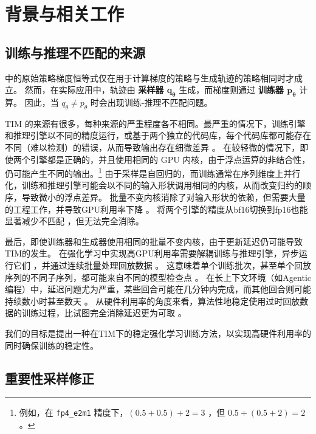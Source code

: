 \section{背景与相关工作}
\label{sec:background}

\subsection{训练与推理不匹配的来源}

 中的原始策略梯度恒等式仅在用于计算梯度的策略与生成轨迹的策略相同时才成立。  
然而，在实际应用中，轨迹由 \textbf{采样器 $\bm{q_\theta}$ } 生成，而梯度则通过 \textbf{训练器 $\bm{p_\theta}$ } 计算。  
因此，当 $q_\theta \ne p_\theta$ 时会出现训练-推理不匹配问题。

TIM 的来源有很多，每种来源的严重程度各不相同。最严重的情况下，训练引擎和推理引擎以不同的精度运行，或基于两个独立的代码库，每个代码库都可能存在不同（难以检测）的错误，从而导致输出存在细微差异 \citep{speed_kills_stability, flashinfer_sentinel}。  
在较轻微的情况下，即使两个引擎都是正确的，并且使用相同的 GPU 内核，由于浮点运算的非结合性，仍可能产生不同的输出。\footnote{例如，在 \texttt{fp4\_e2m1} 精度下，$(0.5+0.5)+2=3$ ，但 $0.5+(0.5+2)=2$ 。}
由于采样是自回归的，而训练通常在序列维度上并行化，训练和推理引擎可能会以不同的输入形状调用相同的内核，从而改变归约的顺序，导致微小的浮点差异。  
批量不变内核消除了对输入形状的依赖，但需要大量的工程工作，并导致GPU利用率下降 \citep{thinky_nondeterminism}。  
将两个引擎的精度从bf16切换到fp16也能显著减少不匹配 \citep{fp16_rl}，但无法完全消除。

最后，即使训练器和生成器使用相同的批量不变内核，由于更新延迟仍可能导致TIM的发生。  
在强化学习中实现高GPU利用率需要解耦训练与推理引擎，异步运行它们 \citep{areal}，并通过连续批量处理回放数据 \citep{orca}。  
这意味着单个训练批次，甚至单个回放序列的不同子序列，都可能来自不同的模型检查点 \citep{pipelineRL}。  
在长上下文环境（如Agentic编程）中，延迟问题尤为严重，某些回合可能在几分钟内完成，而其他回合则可能持续数小时甚至数天 \citep{single_rollout}。  
从硬件利用率的角度来看，算法性地稳定使用过时回放数据的训练过程，比试图完全消除延迟更为可取 \citep{areal}。

我们的目标是提出一种在TIM下的稳定强化学习训练方法，以实现高硬件利用率的同时确保训练的稳定性。

\subsection{重要性采样修正}

